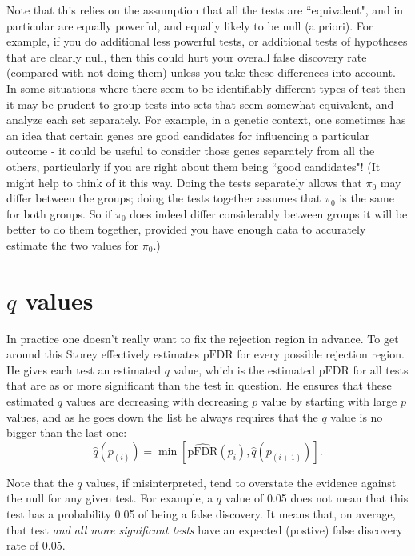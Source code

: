 \documentclass[times,11pt]{article}
\def\pFDR{\text{pFDR}}
\begin{document}
Note that this relies on the assumption that all the tests are ``equivalent", and in particular are equally powerful, and equally likely to be null (a priori). For example, if you do additional less powerful tests, or additional tests of hypotheses that are clearly null, then this could hurt your overall false discovery rate (compared with not doing them) unless you take these differences into account. In some situations where there seem to be identifiably different types of test then it may be prudent to group tests into sets that seem somewhat equivalent, and analyze each set separately. For example, in a genetic context, one sometimes has an idea that certain
genes are good candidates for influencing a particular outcome - it could be useful to consider
those genes separately from all the others,
particularly if you are right about them being ``good candidates"!  (It might help to think of it this way. Doing the tests separately allows that $\pi_0$ may differ between the groups; doing the tests together assumes that $\pi_0$ is the same for both groups. So if $\pi_0$ does indeed
differ considerably between groups it will be better
to do them together, provided you have enough data to accurately estimate the two values for $\pi_0$.)

\section{$q$ values}

In practice one doesn't really want to fix the rejection region in advance. To get around this Storey effectively estimates $\pFDR$ for every possible rejection region. He gives each test an estimated $q$ value, which is the estimated $\pFDR$ for all tests that are as or more significant than the test in question. He ensures that these estimated $q$ values are decreasing with decreasing $p$ value by starting with large $p$ values, and as he goes down the list he always requires that the $q$ value is no bigger than the last one:
\begin{equation}
\hat{q}(p_{(i)}) = \min [\widehat{\pFDR}(p_{i}) , \hat{q}(p_{(i+1)}) ].
\end{equation}

Note that the $q$ values, if misinterpreted, tend to overstate the evidence against the null for any given test. For example, a $q$ value of 0.05 does not mean that this test has a probability 0.05 of being a false discovery. It means that, on average, that test {\it and all more significant tests} have an expected (postive) false discovery rate of 0.05.
\end{document}
